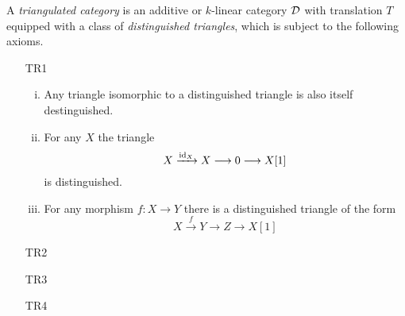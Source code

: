 \begin{definition}
    A \emph{triangulated category} is an additive or $k$-linear category $\mathcal D$ with translation $T$ equipped with a class of \emph{distinguished triangles}, which is subject to the following axioms.
    \begin{enumerate}
        \item[TR1] \begin{enumerate}[(i)]
            \item Any triangle isomorphic to a distinguished triangle is also itself destinguished.
            \item For any $X$ the triangle
            \[
                X \xrightarrow{\operatorname{id}_X} X \longrightarrow 0 \longrightarrow X[1]
            \] 
            is distinguished.
            \item For any morphism $f \colon X \to Y$ there is a distinguished triangle of the form
            \[
                X \xrightarrow{\ f \ } Y \longrightarrow Z \longrightarrow X[1]
            \]
            \end{enumerate}
        \item[TR2]
        \item[TR3]
        \item[TR4]    
    \end{enumerate} 
\end{definition}

        


